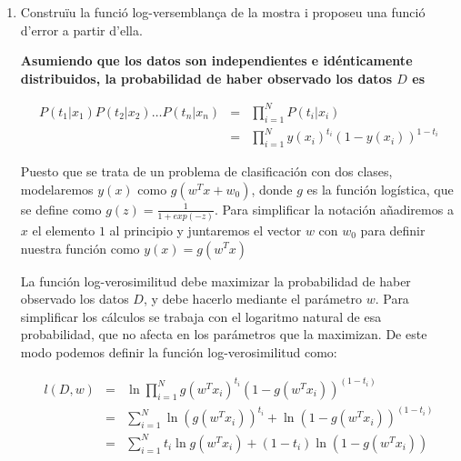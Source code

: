 \documentclass[a4paper]{article}
\begin{document}
\begin{enumerate}
 \item Construïu la funció log-versemblança de la mostra i proposeu una funció d'error a partir d'ella.

       {\bfseries
       Asumiendo que los datos son independientes e idénticamente distribuidos, la probabilidad de haber observado los datos $D$ es

       \begin{eqnarray*}
        P(t_1 | x_1 )P(t_2 | x_2 )\dots P(t_n | x_n ) &=& \prod_{i = 1}^{N} P(t_i | x_i ) \\
        &=& \prod_{i = 1}^{N} y(x_i)^{t_i} (1 - y(x_i))^{1-t_i}
       \end{eqnarray*}

       Puesto que se trata de un problema de clasificación con dos clases, modelaremos $y(x)$ como $g(w^Tx + w_0)$, donde $g$ es la función logística, que se define como $g(z) = \frac{1}{1 + exp(-z)}$. Para simplificar la notación añadiremos a $x$ el elemento $1$ al principio y juntaremos el vector $w$ con $w_0$ para definir nuestra función como $y(x) = g(w^Tx)$


       La función log-verosimilitud debe maximizar la probabilidad de haber observado los datos $D$, y debe hacerlo mediante el parámetro $w$. Para simplificar los cálculos se trabaja con el logaritmo natural de esa probabilidad, que no afecta en los parámetros que la maximizan. De este modo podemos definir la función log-verosimilitud como:


       \begin{eqnarray*}
        l(D, w)
        &=& \ln
        \prod_{i = 1}^{N}
        g(w^Tx_i)^{t_i}
        (1 - g(w^Tx_i))^{(1 - t_i)} \\
        &=&
        \sum_{i = 1}^{N} \ln(g(w^Tx_i))^{t_i} + \ln (1 - g(w^Tx_i))^{(1 - t_i)} \\
        &=&
        \sum_{i = 1}^{N}
        t_i\ln g(w^Tx_i) + (1-t_i)\ln(1-g(w^Tx_i))
       \end{eqnarray*}

}
\end{enumerate}
\end{document}
